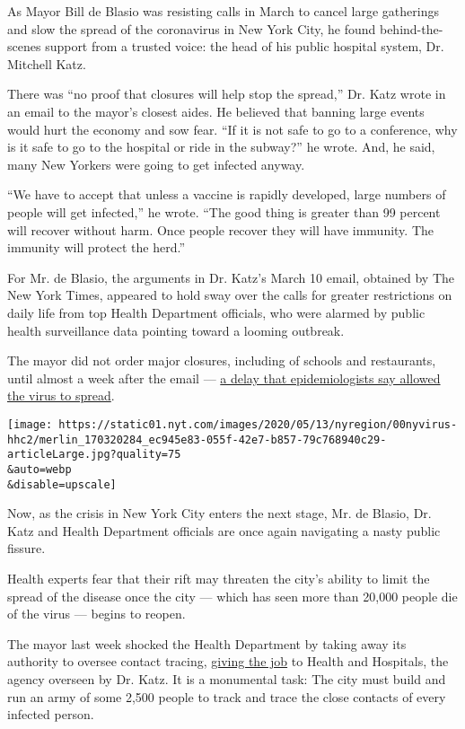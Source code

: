 As Mayor Bill de Blasio was resisting calls in March to cancel large
gatherings and slow the spread of the coronavirus in New York City, he
found behind-the-scenes support from a trusted voice: the head of his
public hospital system, Dr. Mitchell Katz.

There was ``no proof that closures will help stop the spread,'' Dr. Katz
wrote in an email to the mayor's closest aides. He believed that banning
large events would hurt the economy and sow fear. ``If it is not safe to
go to a conference, why is it safe to go to the hospital or ride in the
subway?'' he wrote. And, he said, many New Yorkers were going to get
infected anyway.

``We have to accept that unless a vaccine is rapidly developed, large
numbers of people will get infected,'' he wrote. ``The good thing is
greater than 99 percent will recover without harm. Once people recover
they will have immunity. The immunity will protect the herd.''

For Mr. de Blasio, the arguments in Dr. Katz's March 10 email, obtained
by The New York Times, appeared to hold sway over the calls for greater
restrictions on daily life from top Health Department officials, who
were alarmed by public health surveillance data pointing toward a
looming outbreak.

The mayor did not order major closures, including of schools and
restaurants, until almost a week after the email ---
\href{https://www.nytimes.com/2020/04/08/nyregion/new-york-coronavirus-response-delays.html}{a
delay that epidemiologists say allowed the virus to spread}.

\texttt{[image: https://static01.nyt.com/images/2020/05/13/nyregion/00nyvirus-hhc2/merlin\_170320284\_ec945e83-055f-42e7-b857-79c768940c29-articleLarge.jpg?quality=75\\\&auto=webp\\\&disable=upscale]}

Now, as the crisis in New York City enters the next stage, Mr. de
Blasio, Dr. Katz and Health Department officials are once again
navigating a nasty public fissure.

Health experts fear that their rift may threaten the city's ability to
limit the spread of the disease once the city --- which has seen more
than 20,000 people die of the virus --- begins to reopen.

The mayor last week shocked the Health Department by taking away its
authority to oversee contact tracing,
\href{https://www.nytimes.com/2020/05/07/nyregion/coronavirus-contact-tracing-nyc.html}{giving
the job} to Health and Hospitals, the agency overseen by Dr. Katz. It is
a monumental task: The city must build and run an army of some 2,500
people to track and trace the close contacts of every infected person.


